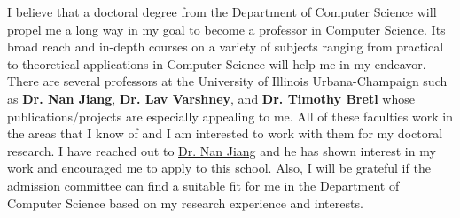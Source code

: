 \documentclass{article}
\begin{document}
I believe that a doctoral degree from the Department of Computer Science will propel me a long way in my goal to become a professor in Computer Science. Its broad reach and in-depth courses on a  variety of subjects ranging from practical to theoretical applications in Computer Science will help me in my endeavor. There are several professors at the University of Illinois Urbana-Champaign such as \textbf{Dr. Nan Jiang}, \textbf{Dr. Lav Varshney}, and \textbf{Dr. Timothy Bretl} whose publications/projects are especially appealing to me. All of these faculties work in the areas that I know of and I am interested to work with them for my doctoral research. I have reached out to \underline{\color{red}\href{http://nanjiang.cs.illinois.edu/}{Dr. Nan Jiang}} and he has shown interest in my work and encouraged me to apply to this school. Also, I will be grateful if the admission committee can find a suitable fit for me in the Department of Computer Science based on my research experience and interests.







\end{document}

